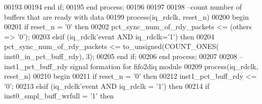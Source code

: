 \begin{DoxyCode}
00193             
00194    \textcolor{keywordflow}{end} \textcolor{keywordflow}{if};
00195 \textcolor{keywordflow}{end} \textcolor{keywordflow}{process};
00196 
00197 
00198 \textcolor{keyword}{--count number of buffers that are ready with data}
00199 \textcolor{keywordflow}{process}(iq_rdclk, reset_n)
00200 \textcolor{vhdlkeyword}{begin}
00201    \textcolor{keywordflow}{if} \textcolor{vhdlchar}{reset_n} \textcolor{vhdlchar}{=} \textcolor{vhdlchar}{'}\textcolor{vhdllogic}{}\textcolor{vhdllogic}{0}\textcolor{vhdlchar}{'} \textcolor{keywordflow}{then} 
00202       \textcolor{vhdlchar}{pct_sync_num_of_rdy_packets} \textcolor{vhdlchar}{<=} \textcolor{vhdlchar}{(}\textcolor{keywordflow}{others} \textcolor{vhdlchar}{=}\textcolor{vhdlchar}{>} \textcolor{vhdlchar}{'}\textcolor{vhdllogic}{}\textcolor{vhdllogic}{0}\textcolor{vhdlchar}{'}\textcolor{vhdlchar}{)};
00203    \textcolor{keywordflow}{elsif} \textcolor{vhdlchar}{(}\textcolor{vhdlchar}{iq_rdclk}\textcolor{vhdlchar}{'}\textcolor{vhdlkeyword}{event} \textcolor{keywordflow}{AND} \textcolor{vhdlchar}{iq_rdclk}\textcolor{vhdlchar}{=}\textcolor{vhdlchar}{'}\textcolor{vhdllogic}{}\textcolor{vhdllogic}{1}\textcolor{vhdlchar}{'}\textcolor{vhdlchar}{)} \textcolor{keywordflow}{then} 
00204       \textcolor{vhdlchar}{pct_sync_num_of_rdy_packets} \textcolor{vhdlchar}{<=} \textcolor{vhdlchar}{to\_unsigned}\textcolor{vhdlchar}{(}\textcolor{vhdlchar}{COUNT\_ONES}\textcolor{vhdlchar}{(}\textcolor{vhdlchar}{
      inst0_in_pct_buff_rdy}\textcolor{vhdlchar}{)}\textcolor{vhdlchar}{,} \textcolor{vhdllogic}{}\textcolor{vhdllogic}{3}\textcolor{vhdlchar}{)};
00205    \textcolor{keywordflow}{end} \textcolor{keywordflow}{if}; 
00206 \textcolor{keywordflow}{end} \textcolor{keywordflow}{process};
00207 
00208 \textcolor{keyword}{--inst1\_pct\_buff\_rdy signal formation for fifo2diq module}
00209 \textcolor{keywordflow}{process}(iq_rdclk, reset_n)
00210 \textcolor{vhdlkeyword}{begin}
00211    \textcolor{keywordflow}{if} \textcolor{vhdlchar}{reset_n} \textcolor{vhdlchar}{=} \textcolor{vhdlchar}{'}\textcolor{vhdllogic}{}\textcolor{vhdllogic}{0}\textcolor{vhdlchar}{'} \textcolor{keywordflow}{then} 
00212       inst1\_pct\_buff\_rdy <= '0';
00213    \textcolor{keywordflow}{elsif} \textcolor{vhdlchar}{(}\textcolor{vhdlchar}{iq_rdclk}\textcolor{vhdlchar}{'}\textcolor{vhdlkeyword}{event} \textcolor{keywordflow}{AND} \textcolor{vhdlchar}{iq_rdclk} \textcolor{vhdlchar}{=} \textcolor{vhdlchar}{'}\textcolor{vhdllogic}{}\textcolor{vhdllogic}{1}\textcolor{vhdlchar}{'}\textcolor{vhdlchar}{)} \textcolor{keywordflow}{then}
00214       \textcolor{keywordflow}{if} \textcolor{vhdlchar}{inst0_smpl_buff_wrfull} \textcolor{vhdlchar}{=} \textcolor{vhdlchar}{'}\textcolor{vhdllogic}{}\textcolor{vhdllogic}{1}\textcolor{vhdlchar}{'} \textcolor{keywordflow}{then} 

\end{DoxyCode}
